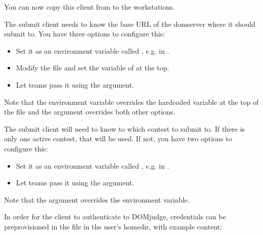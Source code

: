 \documentclass[a4paper,10pt,english,openany]{sphinxmanual}
\begin{document}
\sphinxAtStartPar
You can now copy this client from  to the workstations.

\sphinxAtStartPar
The submit client needs to know the base URL of the domserver where it should
submit to. You have three options to configure this:
\begin{itemize}
\item {} 
\sphinxAtStartPar
Set it as an environment variable called , e.g. in
.

\item {} 
\sphinxAtStartPar
Modify the  file and set the variable of 
at the top.

\item {} 
\sphinxAtStartPar
Let teams pass it using the  argument.

\end{itemize}

\sphinxAtStartPar
Note that the environment variable overrides the hardcoded variable at
the top of the file and the  argument overrides both other options.

\sphinxAtStartPar
The submit client will need to know to which contest to submit to. If there
is only one active contest, that will be used. If not, you have two options
to configure this:
\begin{itemize}
\item {} 
\sphinxAtStartPar
Set it as an environment variable called , e.g. in
.

\item {} 
\sphinxAtStartPar
Let teams pass it using the  argument.

\end{itemize}

\sphinxAtStartPar
Note that the  argument overrides the environment variable.

\sphinxAtStartPar
In order for the client to authenticate to DOMjudge, credentials can be
pre\sphinxhyphen{}provisioned in the file  in the user’s homedir, with example
content:
\end{document}
